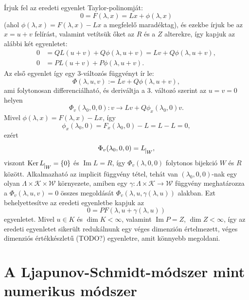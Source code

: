 \documentclass[oneside, titlepage, 12pt, a4paper]{report}
\DeclareMathOperator{\Ima}{Im}	%
\DeclareMathOperator{\Ker}{Ker}	%
\begin{document}
Írjuk fel az eredeti egyenlet Taylor-polinomját:
\begin{equation*}
0 = F(\lambda, x) = Lx + \phi (\lambda, x)
\end{equation*}
(ahol $\phi(\lambda, x) = F(\lambda, x) - Lx$ a megfelelő maradéktag), és ezekbe írjuk be az $x = u + v$ felírást, valamint vetítsük őket az $R$ és a $Z$ alterekre, így kapjuk az alábbi két egyenletet:
\begin{align*}
0 &= QL(u + v) + Q\phi (\lambda, u + v) = Lv + Q\phi (\lambda, u + v), \\
0 &= PL(u + v) + P\phi (\lambda, u + v).
\end{align*}
Az első egyenlet így egy 3-változós függvényt ír le:
\begin{equation*}
\Phi(\lambda, u, v) := Lv + Q\phi (\lambda, u + v),
\end{equation*}
ami folytonosan differenciálható, és deriváltja a 3. változó szerint az $u = v = 0$ helyen
\begin{equation*}
\Phi_v (\lambda_0, 0, 0) : v \rightarrow Lv + Q\phi_x(\lambda_0, 0)v.
\end{equation*}
Mivel $\phi(\lambda, x) = F(\lambda, x) - Lx$, így
\begin{equation*}
\phi_x(\lambda_0, 0) = F_x(\lambda_0, 0) - L = L - L = 0,
\end{equation*}
ezért
\begin{equation*}
\Phi_v (\lambda_0, 0, 0) = L_{\mkern 1mu \vrule height 2ex\mkern2mu W},
\end{equation*}
viszont $\Ker L_{\mkern 1mu \vrule height 2ex\mkern2mu W} = \{0\}$ és $\Ima L = R$, így $\Phi_v (\lambda, 0, 0)$ folytonos bijekció $W$ és $R$ között. Alkalmazható az implicit függvény tétel, tehát van $(\lambda_0, 0, 0)$-nak egy olyan $\Lambda \times \mathcal{K} \times \mathcal{W}$ környezete, amiben egy $\gamma : \Lambda \times \mathcal{K} \rightarrow \mathcal{W}$ függvény meghatározza a $\Phi_v (\lambda, u, v) = 0$ összes megoldását $\Phi_v (\lambda, u, \gamma(\lambda, u))$ alakban.
Ezt behelyettesítve az eredeti egyenletbe kapjuk az
\begin{equation*}
0 = P F(\lambda, u + \gamma(\lambda, u))
\end{equation*}
egyenletet. Mivel $u \in K$ és $\dim K < \infty$, valamint $\Ima P = Z$, $\dim Z < \infty$, így az eredeti egyenletet sikerült redukálnunk egy véges dimenzión értelmezett, véges dimenziós értékkészletű (TODO?) egyenletre, amit könnyebb megoldani.


\onehalfspacing
\chapter{A Ljapunov-Schmidt-módszer mint numerikus módszer}
\label{chap:numeric}
\end{document}
